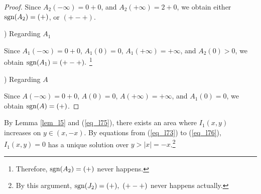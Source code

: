 \begin{proof}
Since $A_2(-\infty) = 0+0$, and $A_2(+\infty) = 2+0$, we obtain either $\mbox{sgn}(A_2)=(+)$, or $(+-+)$.

\smallskip

) Regarding $A_1$

Since $A_1(-\infty) = 0+0$, $A_1(0) = 0$, $A_1(+\infty) = +\infty$, and $A_2(0) > 0$, we obtain $\mbox{sgn}(A_1)=(+-+).$ \footnote{Therefore, $\mbox{sgn}(A_2)=(+)$ never happens.}

\smallskip

) Regarding $A$

Since $A(-\infty) = 0+0$, $A(0) = 0$, $A(+\infty) = +\infty$, and $A_1(0) = 0$, we obtain $\mbox{sgn}(A)=(+)$.
\end{proof}

By Lemma \ref{lem_l5} and (\ref{eq_l75}), there exists an area where
$I_1(x,y)$ increases on $y \in (x, -x)$.  By equations from
(\ref{eq_l73}) to (\ref{eq_l76}), $I_1(x,y)=0$ has a unique solution
over $y>|x|=-x$.\footnote{By this argument, $\mbox{sgn}(J_2)=(+),\ (+-+)$
never happens actually. }

